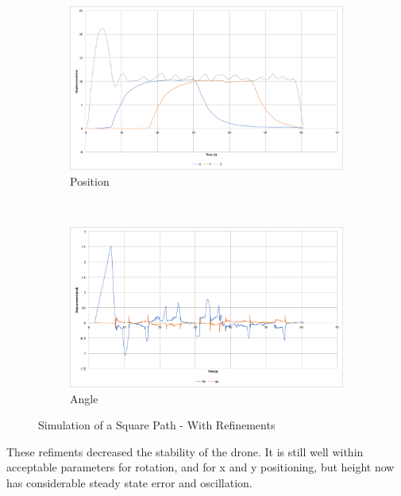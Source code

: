 \documentclass[11pt]{article}
\begin{document}
\begin{figure}
    \begin{subfigure}{\textwidth}
        \includegraphics[width=\linewidth]{square_path_limited_servos}
        \caption{Position}
        \label{fig:square_path_limited_servos}
    \end{subfigure}\hspace*{\fill}
    \\
    \begin{subfigure}{\textwidth}
        \includegraphics[width=\linewidth]{square_path_limited_servos_angle}
        \caption{Angle}
        \label{fig:square_path_limited_servos_angle}
    \end{subfigure}

    \caption{Simulation of a Square Path - With Refinements}
    \label{fig:Square Path Refined}
\end{figure}

These refiments decreased the stability of the drone. It is still well within acceptable parameters for rotation, and for x and y positioning, but height now has considerable steady state error and oscillation. \label{height overshoot}
\end{document}

